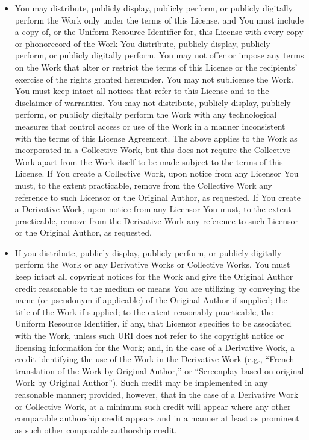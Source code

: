 \begin{itemize}
\begin{itemize} \item You may distribute, publicly display, publicly
perform, or publicly digitally perform the Work only under the terms
of this License, and You must include a copy of, or the Uniform
Resource Identifier for, this License with every copy or phonorecord
of the Work You distribute, publicly display, publicly perform, or
publicly digitally perform.  You may not offer or impose any terms on
the Work that alter or restrict the terms of this License or the
recipients' exercise of the rights granted hereunder.  You may not
sublicense the Work.  You must keep intact all notices that refer to
this License and to the disclaimer of warranties.  You may not
distribute, publicly display, publicly perform, or publicly digitally
perform the Work with any technological measures that control access
or use of the Work in a manner inconsistent with the terms of this
License Agreement.  The above applies to the Work as incorporated in a
Collective Work, but this does not require the Collective Work apart
from the Work itself to be made subject to the terms of this License. 
If You create a Collective Work, upon notice from any Licensor You
must, to the extent practicable, remove from the Collective Work any
reference to such Licensor or the Original Author, as requested.  If
You create a Derivative Work, upon notice from any Licensor You must,
to the extent practicable, remove from the Derivative Work any
reference to such Licensor or the Original Author, as requested.

\item If you distribute, publicly display, publicly perform, or
publicly digitally perform the Work or any Derivative Works or
Collective Works, You must keep intact all copyright notices for the
Work and give the Original Author credit reasonable to the medium or
means You are utilizing by conveying the name (or pseudonym if
applicable) of the Original Author if supplied; the title of the Work
if supplied; to the extent reasonably practicable, the Uniform
Resource Identifier, if any, that Licensor specifies to be associated
with the Work, unless such URI does not refer to the copyright notice
or licensing information for the Work; and, in the case of a
Derivative Work, a credit identifying the use of the Work in the
Derivative Work (e.g., ``French translation of the Work by Original
Author,'' or ``Screenplay based on original Work by Original
Author'').  Such credit may be implemented in any reasonable manner;
provided, however, that in the case of a Derivative Work or Collective
Work, at a minimum such credit will appear where any other comparable
authorship credit appears and in a manner at least as prominent as
such other comparable authorship credit.


\end{itemize}
\end{itemize}
